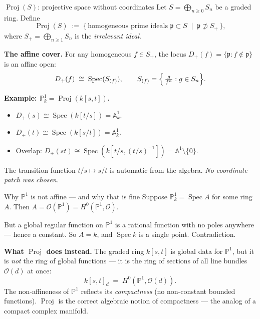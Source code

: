 \documentclass[aspectratio=169,12pt]{beamer}
\begin{document}
\begin{frame}{$\operatorname{Proj}(S)$: projective space without coordinates}
  Let $S = \bigoplus_{n \geq 0} S_n$ be a graded ring.
  Define
  \[
    \operatorname{Proj}(S) \;:=\;
    \{\,\text{homogeneous prime ideals } \mathfrak{p} \subset S
    \;\mid\; \mathfrak{p} \not\supset S_+\,\},
  \]
  where $S_+ = \bigoplus_{n \geq 1} S_n$ is the \emph{irrelevant ideal}.

  \medskip

  \textbf{The affine cover.}\enspace
  For any homogeneous $f \in S_+$, the locus $D_+(f) = \{\mathfrak{p} : f \notin \mathfrak{p}\}$
  is an affine open:
  \[
    D_+(f) \;\cong\; \operatorname{Spec}(S_{(f)}),
    \qquad
    S_{(f)} = \Bigl\{\,\tfrac{g}{f^n} : g \in S_n\Bigr\}.
  \]

  \textbf{Example: $\mathbb{P}^1_k = \operatorname{Proj}(k[s,t])$.}
  \begin{itemize}
    \item $D_+(s) \cong \operatorname{Spec}(k[t/s]) = \mathbb{A}^1_k$.
    \item $D_+(t) \cong \operatorname{Spec}(k[s/t]) = \mathbb{A}^1_k$.
    \item Overlap: $D_+(st) \cong \operatorname{Spec}(k[t/s,(t/s)^{-1}]) = \mathbb{A}^1 \setminus \{0\}$.
  \end{itemize}
  The transition function $t/s \mapsto s/t$ is automatic from the algebra.
  \emph{No coordinate patch was chosen.}
\end{frame}

\begin{frame}{Why $\mathbb{P}^1$ is not affine — and why that is fine}
  Suppose $\mathbb{P}^1_k = \operatorname{Spec} A$ for some ring $A$.
  Then $A = \mathcal{O}(\mathbb{P}^1) = H^0(\mathbb{P}^1, \mathcal{O})$.

  \medskip

  But a global regular function on $\mathbb{P}^1$ is a rational function
  with no poles anywhere — hence a constant.
  So $A = k$, and $\operatorname{Spec} k$ is a single point.
  Contradiction.

  \medskip

  \textbf{What $\operatorname{Proj}$ does instead.}\enspace
  The graded ring $k[s,t]$ is global data for $\mathbb{P}^1$,
  but it is \emph{not} the ring of global functions — it is the ring of
  sections of all line bundles $\mathcal{O}(d)$ at once:
  \[
    k[s,t]_d \;=\; H^0(\mathbb{P}^1, \mathcal{O}(d)).
  \]
  The non-affineness of $\mathbb{P}^1$ reflects its \emph{compactness}
  (no non-constant bounded functions).
  $\operatorname{Proj}$ is the correct algebraic notion of compactness —
  the analog of a compact complex manifold.
\end{frame}
\end{document}
